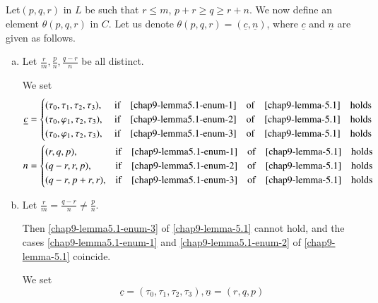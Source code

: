 \setcounter{subsection}{1}
\subsection{}\label{chap9-subsec-5.2}
Let\pageoriginale $(p, q,r)$ in $L$ be such that $ r \leq m$, $p + r \geq q \geq r +n$. We now define an element $\theta(p,q,r)$ in $C$. Let us denote $\theta(p,q,r) = (\underline{c}, \underline{n})$, where $\underline{c}$ and $\underline{n}$ are given as follows.
\begin{enumerate}[(a)]
\item  Let $\frac{r}{m}, \frac{p}{n}, \frac{q-r}{n}$ be all distinct.\label{chap9-subsec5.2-enum-a}

We set
\begin{align*}
\underline{c} &=
\begin{cases}
(\tau_{0},\tau_{1},\tau_{2},\tau_{3}), & \text{ if}\quad  \eqref{chap9-lemma5.1-enum-1}\quad \text{of} \quad\eqref{chap9-lemma-5.1}\quad \text{holds}\\
(\tau_{0}, \varphi_{1}, \tau_{2}, \tau_{3}), & \text{ if}\quad  \eqref{chap9-lemma5.1-enum-2}\quad \text{of} \quad\eqref{chap9-lemma-5.1}\quad \text{holds}\\ 
(\tau_{0}, \varphi_{1}, \tau_{2}, \tau_{3}), & \text{ if}\quad  \eqref{chap9-lemma5.1-enum-3}\quad \text{of} \quad\eqref{chap9-lemma-5.1}\quad \text{holds}
\end{cases}\\
n &=
\begin{cases}
(r,q, p),  &\text{if} \quad  \eqref{chap9-lemma5.1-enum-1}\quad \text{of} \quad\eqref{chap9-lemma-5.1}\quad \text{holds}\\
(q-r,r,p), & \text{if} \quad  \eqref{chap9-lemma5.1-enum-2}\quad \text{of} \quad\eqref{chap9-lemma-5.1}\quad \text{holds}\\
(q-r, p+r, r), & \text{if} \quad  \eqref{chap9-lemma5.1-enum-3}\quad \text{of} \quad\eqref{chap9-lemma-5.1}\quad \text{holds}
\end{cases}
\end{align*}

\item Let $\frac{r}{m} = \frac{q-r}{n} \neq \frac{p}{n}$.\label{chap9-subsec5.2-enum-b}

Then \eqref{chap9-lemma5.1-enum-3} of \ref{chap9-lemma-5.1} cannot hold, and the cases \eqref{chap9-lemma5.1-enum-1} and
\eqref{chap9-lemma5.1-enum-2} of \ref{chap9-lemma-5.1} coincide.

We set
$$
\underline{c}=(\tau_{0}, \tau_{1}, \tau_{2}, \tau_{3}), \underline{n}= (r, q, p)
$$


\end{enumerate}

